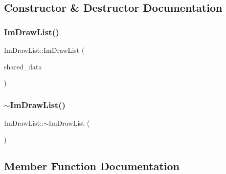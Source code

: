 \subsection{Constructor \& Destructor Documentation}
\hypertarget{struct_im_draw_list_a7c2af665f2c3e3bb5fc8aa34ef6dac91}{}\label{struct_im_draw_list_a7c2af665f2c3e3bb5fc8aa34ef6dac91} 
\subsubsection{\texorpdfstring{Im\+Draw\+List()}{ImDrawList()}}
{\footnotesize\ttfamily Im\+Draw\+List\+::\+Im\+Draw\+List (\begin{DoxyParamCaption}\item[{const \hyperlink{struct_im_draw_list_shared_data}{Im\+Draw\+List\+Shared\+Data} $\ast$}]{shared\+\_\+data }\end{DoxyParamCaption})}

\hypertarget{struct_im_draw_list_a19fd8d920c202cf8ba5f5c55c43d1d2a}{}\label{struct_im_draw_list_a19fd8d920c202cf8ba5f5c55c43d1d2a} 
\subsubsection{\texorpdfstring{$\sim$\+Im\+Draw\+List()}{~ImDrawList()}}
{\footnotesize\ttfamily Im\+Draw\+List\+::$\sim$\+Im\+Draw\+List (\begin{DoxyParamCaption}{ }\end{DoxyParamCaption})}



\subsection{Member Function Documentation}
\hypertarget{struct_im_draw_list_afd2eeeb8ed23b6222513953b03620101}{}\label{struct_im_draw_list_afd2eeeb8ed23b6222513953b03620101} 

